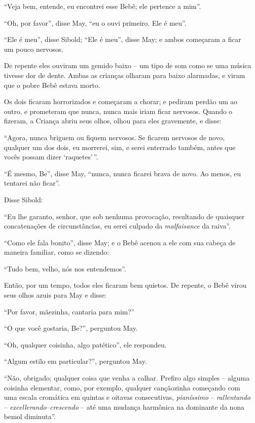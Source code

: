 ``Veja bem, entende, eu encontrei esse Bebê; ele pertence a mim''.

``Oh, por favor'', disse May, ``eu o ouvi primeiro. Ele é meu''.

``Ele é meu'', disse Sibold; ``Ele é meu'', disse May; e ambos começaram
a ficar um pouco nervosos.

De repente eles ouviram um gemido baixo -- um tipo de som como se uma
música tivesse dor de dente. Ambas as crianças olharam para baixo
alarmadas, e viram que o pobre Bebê estava morto.

Os dois ficaram horrorizados e começaram a chorar; e pediram perdão um
ao outro, e prometeram que nunca, nunca mais iriam ficar nervosos.
Quando o fizeram, a Criança abriu seus olhos, olhou para eles
gravemente, e disse:

``Agora, nunca briguem ou fiquem nervosos. Se ficarem nervosos de novo,
qualquer um dos dois, eu morrerei, sim, e serei enterrado também, antes
que vocês possam dizer `raquetes'\,''.

``É mesmo, Be'', disse May, ``nunca, nunca ficarei brava de novo. Ao
menos, eu tentarei não ficar''.

Disse Sibold:

``Eu lhe garanto, senhor, que sob nenhuma provocação, resultando de
quaisquer concatenações de circunstâncias, eu serei culpado da
\emph{malfaisance} da raiva''.

``Como ele fala bonito'', disse May; e o Bebê acenou a ele com sua
cabeça de maneira familiar, como se dizendo:

``Tudo bem, velho, nós nos entendemos''.

Então, por um tempo, todos eles ficaram bem quietos. De repente, o Bebê
virou seus olhos azuis para May e disse:

``Por favor, mãezinha, cantaria para mim?''

``O que você gostaria, Be?'', perguntou May.

``Oh, qualquer coisinha, algo patético'', ele respondeu.

``Algum estilo em particular?'', perguntou May.

``Não, obrigado; qualquer coisa que venha a calhar. Prefiro algo simples
-- alguma coisinha elementar, como, por exemplo, qualquer cançãozinha
começando com uma escala cromática em quintas e oitavas consecutivas,
\emph{pianíssimo} -- \emph{rallentando} --
\emph{excellerando}--\emph{crescendo} -- até uma mudança harmônica na
dominante da nona bemol diminuta''.

